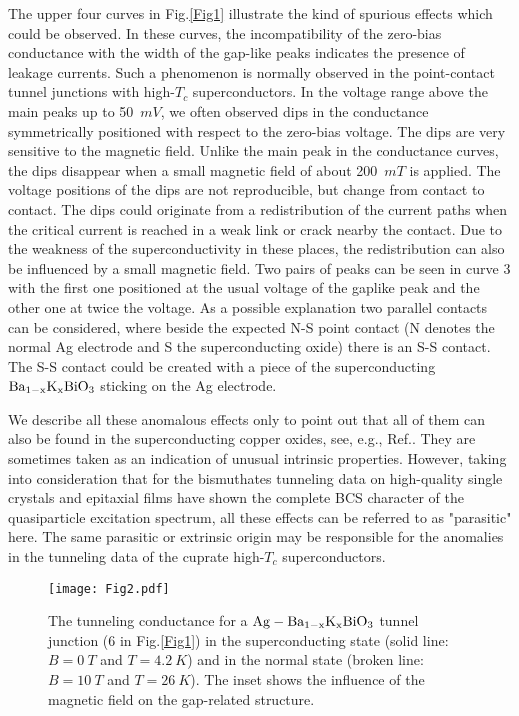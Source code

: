 \documentclass[twocolumn,amsmath,floats,showpacs,nofootinbib]{revtex4}
\begin{document}
The upper four curves in Fig.\ref{Fig1} illustrate the kind of spurious effects which could be observed. In these curves, the incompatibility of the zero-bias conductance with the width of the gap-like peaks indicates the presence of leakage currents. Such a phenomenon is normally observed in the point-contact tunnel junctions with high-$T_c$ superconductors. In the voltage range above the main peaks up to 50~$mV$, we often observed dips in the conductance symmetrically positioned with respect to the zero-bias voltage. The dips are very sensitive to the magnetic field. Unlike the main peak in the conductance curves, the dips disappear when a small magnetic field of about 200~$mT$ is applied. The voltage positions of the dips are not reproducible, but change from contact to contact. The dips could originate from a redistribution of the current paths when the critical current is reached in a weak link or crack nearby the contact. Due to the weakness of the superconductivity in these places, the redistribution can also be influenced by a small magnetic field. Two pairs of peaks can be seen in curve 3 with the first one positioned at the usual voltage of the gaplike peak and the other one at twice the voltage. As a possible explanation two parallel contacts can be considered, where beside the expected N-S point contact (N denotes the normal Ag electrode and S the superconducting oxide) there is an S-S contact. The S-S contact could be created with a piece of the superconducting $\rm Ba_{1-x}K_xBiO_3$ sticking on the Ag electrode.

We describe all these anomalous effects only to point out that all of them can also be found in the superconducting copper oxides, see, e.g., Ref.\cite{14}. They are sometimes taken as an indication of unusual intrinsic properties. However, taking into consideration that for the bismuthates tunneling data on high-quality single crystals and epitaxial films \cite{7,8,9} have shown the complete BCS character of the quasiparticle excitation spectrum, all these effects can be referred to as "parasitic" here. The same parasitic or extrinsic origin may be responsible for the anomalies in the tunneling data of the cuprate high-$T_c$ superconductors.
\begin{figure}[]
\texttt{[image: Fig2.pdf]}
\caption[]{The tunneling conductance for a $\rm Ag-Ba_{1-x}K_xBiO_3$ tunnel junction (6 in Fig.\ref{Fig1}) in the superconducting state (solid line: $B=0\ T$ and $T= 4.2\ K$) and in the normal state (broken line: $B= 10\ T$ and $T=26\ K$). The inset shows the influence of the magnetic field on the gap-related structure.}
\label{Fig2}
\end{figure}
\end{document}
